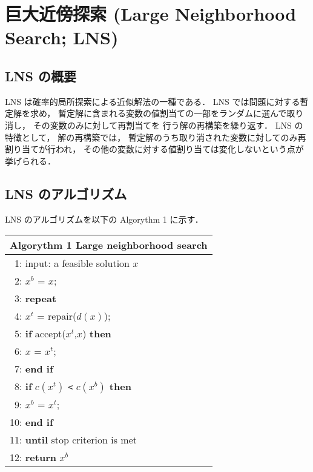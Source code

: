 \section{巨大近傍探索 (Large Neighborhood Search; LNS)}

\subsection{LNS の概要}
LNS は確率的局所探索による近似解法の一種である．
LNS では問題に対する暫定解を求め，
暫定解に含まれる変数の値割当ての一部をランダムに選んで取り消し，
その変数のみに対して再割当てを
行う解の再構築を繰り返す．
LNS の特徴として，
解の再構築では，
暫定解のうち取り消された変数に対してのみ再割り当てが行われ，
その他の変数に対する値割り当ては変化しないという点が挙げられる．

\subsection{LNS のアルゴリズム}
LNS のアルゴリズムを以下の Algorythm 1 に示す．
\begin{table}[htb]
\begin{tabular}{l}\hline
\textbf{Algorythm 1} Large neighborhood search 
\cite{%
 hayama19:kobe}\\ \hline
 ~1: input: a feasible solution $x$ \\
 ~2: $x^b$ = $x$; \\
 ~3: \bf{repeat} \\
 ~4: \quad \quad $x^t$ = repair($d(x)$); \\
 ~5: \quad \quad \textbf{if} accept($x^t$,$x$) \textbf{then} \\
 ~6: \quad \quad \quad \quad $x$ = $x^t$; \\
 ~7: \quad \quad \textbf{end if} \\
 ~8: \quad \quad \textbf{if} $c(x^t)$ \verb|<| $c(x^b)$ \textbf{then} \\
 ~9: \quad \quad \quad \quad $x^b$ = $x^t$; \\
10: \quad \quad \textbf{end if} \\
11: \textbf{until} stop criterion is met \\
12: \textbf{return} $x^b$ \\ \hline
\end{tabular}
\end{table}\\
